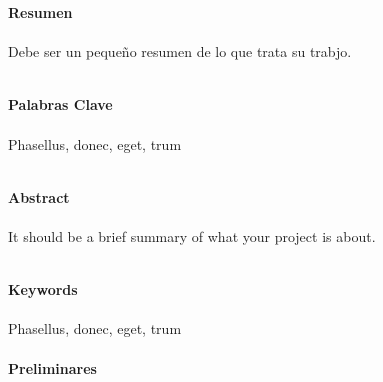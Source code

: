 \documentclass[12pt, oneside]{article}
\begin{document}
\textbf{Resumen}
\\ \\
Debe ser un pequeño resumen de lo que trata su trabjo.
\\ \\
\lipsum[1]
\vspace{1cm}

\textbf{Palabras Clave}
\\ \\
Phasellus, donec, eget, trum \\ \\ %

\vspace{1cm}

\textbf{Abstract}
\\ \\
It should be a brief summary of what your project is about.
\\ \\
\lipsum[1]
\vspace{1cm}

\textbf{Keywords}
\\ \\
Phasellus, donec, eget, trum \\ \\ %
\vspace{1cm}
\textbf{Preliminares}
\\ \\
\lipsum[1]
\vspace{1cm}
\end{document}
